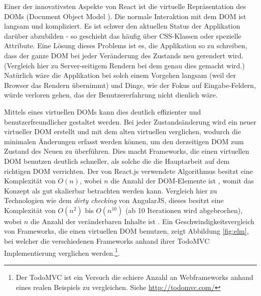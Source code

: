 \documentclass[12pt,twoside]{book}
\begin{document}
Einer der innovativsten Aspekte von React ist die virtuelle Repräsentation des DOMs (Document Object Model \cite{DOM}). Die normale Interaktion mit dem DOM ist langsam und kompliziert. Es ist schwer den aktuellen Status der Applikation darüber abzubilden - so geschieht das häufig über CSS-Klassen oder spezielle Attribute.
Eine Lösung dieses Problems ist es, die Applikation so zu schreiben, dass der ganze DOM bei jeder Veränderung des Zustands neu gerendert wird. (Vergleich hier zu Server-seitigem Rendern bei dem genau dies gemacht wird.) Natürlich wäre die Applikation bei solch einem Vorgehen langsam (weil der Browser das Rendern übernimmt) und Dinge, wie der Fokus auf Eingabe-Feldern, würde verloren gehen, das der Benutzererfahrung nicht dienlich wäre.

Mittels eines virtuellen DOMs kann dies deutlich effizienter und benutzerfreundlicher gestaltet werden. Bei jeder Zustandsänderung wird ein neuer virtueller DOM erstellt und mit dem alten virtuellen verglichen, wodurch die minimalen Änderungen erfasst werden können, um den derzeitigen DOM zum Zustand des Neuen zu überführen. Dies macht Frameworks, die einen virtuellen DOM benutzen deutlich schneller, als solche die die Hauptarbeit auf dem richtigen DOM verrichten. Der von React.js verwendete Algorithmus besitzt eine Komplexität von $O(n)$, wobei $n$ die Anzahl der DOM-Elemente ist \cite{reactreconciliation}, womit das Konzept als gut skalierbar betrachten werden kann. Vergleich hier zu Technologien wie dem \textit{dirty checking} von AngularJS, dieses besitzt eine Komplexität von $O(n^2)$ bis $O(n^{10})$ (ab 10 Iterationen wird abgebrochen), wobei $n$ die Anzahl der veränderbaren Inhalte ist \cite{dirty}.
Ein Geschwindigkeitsvergleich von Frameworks, die einen virtuellen DOM benutzen, zeigt Abbildung \ref{fig:elm}, bei welcher die verschiedenen Frameworks anhand ihrer TodoMVC Implementierung verglichen werden.\footnote{Der TodoMVC ist ein Versuch die schiere Anzahl an Webframeworks anhand eines realen Beispiels zu vergleichen. Siehe \url{http://todomvc.com/}}.
\end{document}
